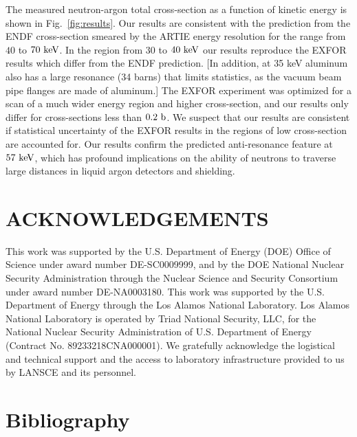 \documentclass[%
 reprint,
superscriptaddress,
 preprintnumbers,
 nofootinbib,
 nobibnotes,
 bibnotes,
 amsmath,amssymb,
 aps,
 prl, 
 floatfix,
]{revtex4-1}
\newcommand{\keV}{\mathrm{ke\kern -0.1em V}}
\begin{document}
The measured neutron-argon total cross-section as a function of
kinetic energy is shown in Fig.~\ref{fig:results}.  Our results are
consistent with the prediction from the ENDF cross-section smeared by
the ARTIE energy resolution for the range from $40$ to $70~\rm keV$.
In the region from $30$ to $40~\rm keV$ our results reproduce the
EXFOR results which differ from the ENDF prediction.
{\color{red} [In addition, at 35 keV aluminum also has a large
    resonance (34 barns) that limits statistics, as the vacuum beam
    pipe flanges are made of aluminum.]}
The EXFOR experiment was optimized for a scan of a
much wider energy region and higher cross-section, and our results
only differ for cross-sections less than $0.2~\rm b$.  We suspect that
our results are consistent if statistical uncertainty of the EXFOR
results in the regions of low cross-section are accounted for.  Our
results confirm the predicted anti-resonance feature at $57~\keV$,
which has profound implications on the ability of neutrons to traverse
large distances in liquid argon detectors and shielding.


\section{\label{sec:acknowledgments}ACKNOWLEDGEMENTS}

This work was supported by the U.S. Department of Energy (DOE) Office
of Science under award number DE-SC0009999, and by the DOE National
Nuclear Security Administration through the Nuclear Science and
Security Consortium under award number DE-NA0003180. This work was
supported by the U.S. Department of Energy through the Los Alamos
National Laboratory. Los Alamos National Laboratory is operated by
Triad National Security, LLC, for the National Nuclear Security
Administration of U.S. Department of Energy (Contract
No. 89233218CNA000001).  We gratefully acknowledge the logistical and
technical support and the access to laboratory infrastructure provided
to us by LANSCE and its personnel.


\section{Bibliography}



\end{document}
